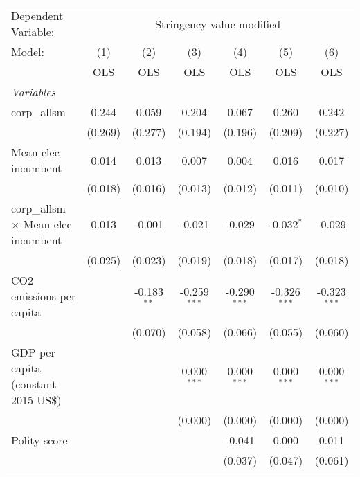 
\begingroup
\centering
\begin{tabular}{lcccccc}
   \toprule
   Dependent Variable: & \multicolumn{6}{c}{Stringency value modified}\\
   Model:                                     & (1)     & (2)           & (3)            & (4)            & (5)            & (6)\\  
                                              &  OLS    & OLS           & OLS            & OLS            & OLS            & OLS\\  
   \midrule
   \emph{Variables}\\
   corp\_allsm                                & 0.244   & 0.059         & 0.204          & 0.067          & 0.260          & 0.242\\   
                                              & (0.269) & (0.277)       & (0.194)        & (0.196)        & (0.209)        & (0.227)\\   
   Mean elec incumbent                        & 0.014   & 0.013         & 0.007          & 0.004          & 0.016          & 0.017\\   
                                              & (0.018) & (0.016)       & (0.013)        & (0.012)        & (0.011)        & (0.010)\\   
   corp\_allsm $\times$ Mean elec incumbent   & 0.013   & -0.001        & -0.021         & -0.029         & -0.032$^{*}$   & -0.029\\   
                                              & (0.025) & (0.023)       & (0.019)        & (0.018)        & (0.017)        & (0.018)\\   
   CO2 emissions per capita                   &         & -0.183$^{**}$ & -0.259$^{***}$ & -0.290$^{***}$ & -0.326$^{***}$ & -0.323$^{***}$\\   
                                              &         & (0.070)       & (0.058)        & (0.066)        & (0.055)        & (0.060)\\   
   GDP per capita (constant 2015 US\$)        &         &               & 0.000$^{***}$  & 0.000$^{***}$  & 0.000$^{***}$  & 0.000$^{***}$\\   
                                              &         &               & (0.000)        & (0.000)        & (0.000)        & (0.000)\\   
   Polity score                               &         &               &                & -0.041         & 0.000          & 0.011\\   
                                              &         &               &                & (0.037)        & (0.047)        & (0.061)\\   

\end{tabular}
